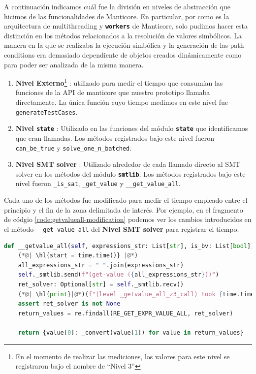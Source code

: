 A continuación indicamos cuál fue la división en niveles de abstracción que hicimos de las funcionalidades de Manticore.
En particular, por como es la arquitectura de multithreading y \textbf{\texttt{workers}} de Manticore, solo pudimos hacer esta distinción en los métodos relacionados a la resolución de valores simbólicos.
La manera en la que se realizaba la ejecución simbólica y la generación de las path conditions era demasiado dependiente de objetos creados dinámicamente como para poder ser analizada de la misma manera.
\begin{enumerate}
    \item \textbf{Nivel Externo}\footnote{En el momento de realizar las mediciones, los valores para este nivel se registraron bajo el nombre de  ``Nivel 3''} : utilizado para medir el tiempo que consumían las funciones de la API de manticore que nuestro prototipo llamaba directamente.
          La única función cuyo tiempo medimos en este nivel fue \texttt{generateTestCases}.
    \item \textbf{Nivel \texttt{state}} : Utilizado en las funciones del módulo \textbf{\texttt{state}} que identificamos que eran llamadas.
          Los métodos registrados bajo este nivel fueron \texttt{can\_be\_true} y \texttt{solve\_\allowbreak one\_\allowbreak n\_\allowbreak batched}.
    \item \textbf{Nivel SMT solver} : Utilizado alrededor de cada llamado directo al SMT solver en los métodos del módulo \textbf{\texttt{smtlib}}.
          Los métodos registrados bajo este nivel fueron \texttt{\_is\_sat}, \texttt{\_get\_value} y \texttt{\_\_get\_value\_all}.
\end{enumerate}
Cada uno de los métodos fue modificado para medir el tiempo empleado entre el principio y el fin de la zona delimitada de interés.
Por ejemplo, en el fragmento de códgio \ref{code:getvalueall-modification} podemos ver los cambios introducidos en el método \texttt{\_\_get\_value\_all} del \textbf{Nivel SMT solver} para registrar el tiempo.

\begin{lstlisting}[language=Python,
    label={code:getvalueall-modification},
    caption={Método \texttt{\_\_get\_value\_all} del modulo \textbf{\texttt{smtlib}} modificado para registrar el tiempo empleado por la llamada al SMT solver. El resaltado indica las líneas agregadas para registrar el tiempo.},
    captionpos=b]
def __getvalue_all(self, expressions_str: List[str], is_bv: List[bool]) -> Dict[str, int]:
    (*@| \hl{start = time.time()} |@*)
    all_expressions_str = " ".join(expressions_str)
    self._smtlib.send(f"(get-value ({all_expressions_str}))")
    ret_solver: Optional[str] = self._smtlib.recv()
    (*@| \hl{print}|@*)(f"(level _getvalue_all_z3_call) took {time.time()- start} seconds")
    assert ret_solver is not None
    return_values = re.findall(RE_GET_EXPR_VALUE_ALL, ret_solver)
    
    return {value[0]: _convert(value[1]) for value in return_values}
\end{lstlisting}


